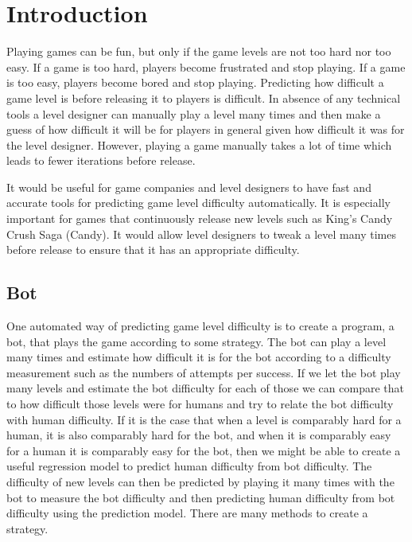 \documentclass{kththesis}
\begin{document}
\tableofcontents


\mainmatter

\chapter{Introduction}
Playing games can be fun, but only if the game levels are not too hard nor too easy. If a game is too hard, players become frustrated and stop playing. If a game is too easy, players become bored and stop playing. Predicting how difficult a game level is before releasing it to players is difficult. In absence of any technical tools a level designer can manually play a level many times and then make a guess of how difficult it will be for players in general given how difficult it was for the level designer. However, playing a game manually takes a lot of time which leads to fewer iterations before release.

It would be useful for game companies and level designers to have fast and accurate tools for predicting game level difficulty automatically. It is especially important for games that continuously release new levels such as King's Candy Crush Saga (Candy). It would allow level designers to tweak a level many times before release to ensure that it has an appropriate difficulty. 

\section{Bot}
One automated way of predicting game level difficulty is to create a program, a bot, that plays the game according to some strategy. The bot can play a level many times and estimate how difficult it is for the bot according to a difficulty measurement such as the numbers of attempts per success. If we let the bot play many levels and estimate the bot difficulty for each of those we can compare that to how difficult those levels were for humans and try to relate the bot difficulty with human difficulty.  If it is the case that when a level is comparably hard for a human, it is also comparably hard for the bot, and when it is comparably easy for a human it is comparably easy for the bot, then we might be able to create a useful regression model to predict human difficulty from bot difficulty. The difficulty of new levels can then be predicted by playing it many times with the bot to measure the bot difficulty and then predicting human difficulty from bot difficulty using the prediction model. There are many methods to create a strategy.
\end{document}
